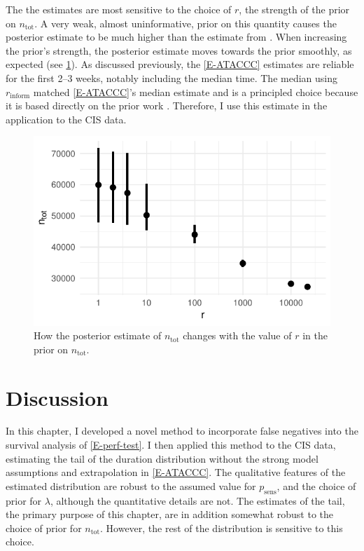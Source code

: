 \documentclass[12pt, letterpaper]{article} %
\newcommand{\psens}{p_\text{sens}}
\newcommand{\ntot}{n_\text{tot}}
\newcommand{\inform}{{_{\text{inform}}}}
\begin{document}
The the estimates are most sensitive to the choice of $r$, the strength of the prior on $\ntot$.
A very weak, almost uninformative, prior on this quantity causes the posterior estimate to be much higher than the estimate from \textcite{birrellRTM2}.
When increasing the prior's strength, the posterior estimate moves towards the prior smoothly, as expected (see \cref{imperf-test:fig:ntot}).
As discussed previously, the \cref{E-ATACCC} estimates are reliable for the first 2--3 weeks, notably including the median time.
The median using $r\inform$ matched \cref{E-ATACCC}'s median estimate and is a principled choice because it is based directly on the prior work \textcite{birrellRTM2}.
Therefore, I use this estimate in the application to the CIS data.
\begin{figure}
  \centering \includegraphics{cis-imperfect-testing/CIS_ntot}
  \caption{How the posterior estimate of $\ntot$ changes with the value of $r$ in the prior on $\ntot$.}
  \label{imperf-test:fig:ntot}
\end{figure}

\section{Discussion}

In this chapter, I developed a novel method to incorporate false negatives into the survival analysis of \cref{E-perf-test}.
I then applied this method to the CIS data, estimating the tail of the duration distribution without the strong model assumptions and extrapolation in \cref{E-ATACCC}.
The qualitative features of the estimated distribution are robust to the assumed value for $\psens$, and the choice of prior for $\lambda$, although the quantitative details are not.
The estimates of the tail, the primary purpose of this chapter, are in addition somewhat robust to the choice of prior for $\ntot$.
However, the rest of the distribution is sensitive to this choice.
\end{document}
